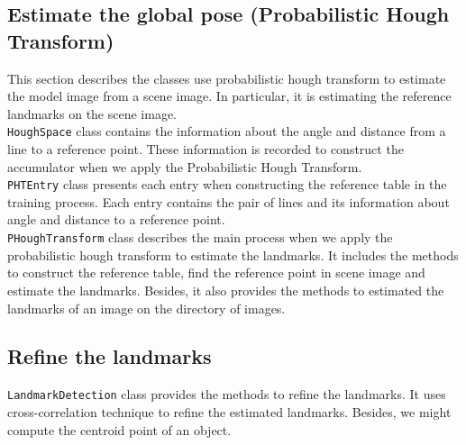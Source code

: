 \subsection{Estimate the global pose (Probabilistic Hough Transform)}
This section describes the classes use probabilistic hough transform to estimate the model image from a scene image. In particular, it is estimating the reference landmarks on the scene image.\\[0.2cm]
\texttt{HoughSpace} class contains the information about the angle and distance from a line to a reference point. These information is recorded to construct the accumulator when we apply the Probabilistic Hough Transform.\\[0.2cm]
\texttt{PHTEntry} class presents each entry when constructing the reference table in the training process. Each entry contains the pair of lines and its information about angle and distance to a reference point.\\[0.2cm]
\texttt{PHoughTransform} class describes the main process when we apply the probabilistic hough transform to estimate the landmarks. It includes the methods to construct the reference table, find the reference point in scene image and estimate the landmarks. Besides, it also provides the methods to estimated the landmarks of an image on the directory of images.
\subsection{Refine the landmarks}
\texttt{LandmarkDetection} class provides the methods to refine the landmarks. It uses cross-correlation technique to refine the estimated landmarks. Besides, we might compute the centroid point of an object.